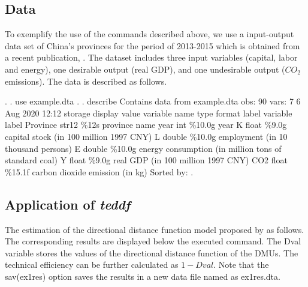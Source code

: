 
\subsection{Data}
To exemplify the use of the commands described above, we use a input-output data set of China's provinces for the period of 2013-2015 which is obtained from a recent publication, \cite{YAN2020}. The dataset includes three input variables (capital, labor and energy), one desirable output (real GDP), and one undesirable output ($CO_2$ emissions). The data is described as follows.

. 
. use example.dta
{\smallskip}
. 
. describe 
{\smallskip}
Contains data from example.dta
obs:            90                          
vars:             7                          6 Aug 2020 12:12
storage   display    value
variable name   type    format     label      variable label
Province        str12   \%12s                  province name
year            int     \%10.0g                year
K               float   \%9.0g                 capital stock (in 100 million 1997 CNY)
L               double  \%10.0g                employment (in 10 thousand persons)
E               double  \%10.0g                energy consumption (in million tons of standard coal)
Y               float   \%9.0g                 real GDP (in 100 million 1997 CNY)
CO2             float   \%15.1f                carbon dioxide emission (in kg)
Sorted by: 
{\smallskip}
. 

\subsection{Application of \textit{teddf}}

The estimation of the directional distance function model proposed by \cite{Chung1997} as follows. The corresponding results are displayed below the executed command. The Dval variable stores the values of the directional distance function of the DMUs. The technical efficiency can be further calculated as $1-Dval$. Note that the sav(ex1res) option saves the results in a new data file named as ex1res.dta.

